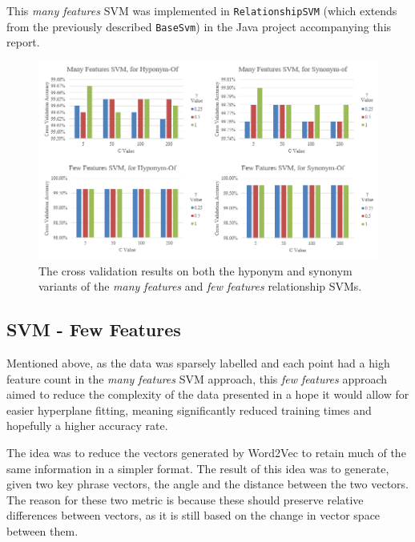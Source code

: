 This \textit{many features} SVM was implemented in \texttt{RelationshipSVM} (which extends from the previously described \texttt{BaseSvm}) in the Java project accompanying this report.

\begin{center}
	\begin{figure}
		\includegraphics[width=\textwidth]{img/relsvmcrossvalidation.png}
		\caption[Relation SVM Cross Validation]{The cross validation results on both the hyponym and synonym variants of the \textit{many features} and \textit{few features} relationship SVMs.}
		\label{figure:relsvmcv}
	\end{figure}
\end{center}

\subsection{SVM - Few Features}
Mentioned above, as the data was sparsely labelled and each point had a high feature count in the \textit{many features} SVM approach, this \textit{few features} approach aimed to reduce the complexity of the data presented in a hope it would allow for easier hyperplane fitting, meaning significantly reduced training times and hopefully a higher accuracy rate.

The idea was to reduce the vectors generated by Word2Vec to retain much of the same information in a simpler format. The result of this idea was to generate, given two key phrase vectors, the angle and the distance between the two vectors. The reason for these two metric is because these should preserve relative differences between vectors, as it is still based on the change in vector space between them.

